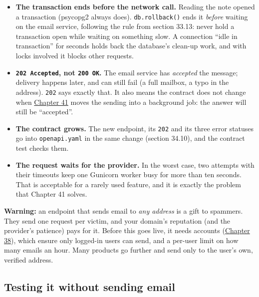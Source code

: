 \begin{itemize}
\tightlist
\item
  \textbf{The transaction ends before the network call.} Reading the note opened a transaction (psycopg2 always does). \texttt{db.rollback()} ends it \emph{before} waiting on the email service, following the rule from section 33.13: never hold a transaction open while waiting on something slow. A connection ``idle in transaction'' for seconds holds back the database's clean-up work, and with locks involved it blocks other requests.
\item
  \textbf{\texttt{202\ Accepted}, not \texttt{200\ OK}.} The email service has \emph{accepted} the message; delivery happens later, and can still fail (a full mailbox, a typo in the address). \texttt{202} says exactly that. It also means the contract does not change when \hyperref[ch:41-event-driven-architecture]{Chapter 41} moves the sending into a background job: the answer will still be ``accepted''.
\item
  \textbf{The contract grows.} The new endpoint, its \texttt{202} and its three error statuses go into \texttt{openapi.yaml} in the same change (section 34.10), and the contract test checks them.
\item
  \textbf{The request waits for the provider.} In the worst case, two attempts with their timeouts keep one Gunicorn worker busy for more than ten seconds. That is acceptable for a rarely used feature, and it is exactly the problem that Chapter 41 solves.
\end{itemize}

\begin{warnbox}

\textbf{Warning:} an endpoint that sends email to \emph{any address} is a gift to spammers. They send one request per victim, and your domain's reputation (and the provider's patience) pays for it. Before this goes live, it needs accounts (\hyperref[ch:38-security]{Chapter 38}), which ensure only logged-in users can send, and a per-user limit on how many emails an hour. Many products go further and send only to the user's own, verified address.

\end{warnbox}

\subsection*{Testing it without sending email}\label{37-reliability:testing-it-without-sending-email}


